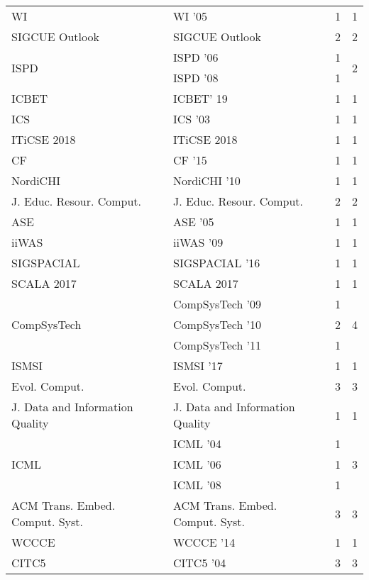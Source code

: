 \begin{table*}[t]
\begin{tabular}{llrr}
\multirow{1}{*}{WI } & WI '05 & 1 & \multirow{1}{*}{1}\\
\multirow{1}{*}{SIGCUE Outlook} & SIGCUE Outlook & 2 & \multirow{1}{*}{2}\\
\multirow{2}{*}{ISPD } & ISPD '06 & 1 & \multirow{2}{*}{2}\\
& ISPD '08 & 1 &\\
\multirow{1}{*}{ICBET} & ICBET' 19 & 1 & \multirow{1}{*}{1}\\
\multirow{1}{*}{ICS } & ICS '03 & 1 & \multirow{1}{*}{1}\\
\multirow{1}{*}{ITiCSE 2018} & ITiCSE 2018 & 1 & \multirow{1}{*}{1}\\
\multirow{1}{*}{CF } & CF '15 & 1 & \multirow{1}{*}{1}\\
\multirow{1}{*}{NordiCHI } & NordiCHI '10 & 1 & \multirow{1}{*}{1}\\
\multirow{1}{*}{J. Educ. Resour. Comput.} & J. Educ. Resour. Comput. & 2 & \multirow{1}{*}{2}\\
\multirow{1}{*}{ASE } & ASE '05 & 1 & \multirow{1}{*}{1}\\
\multirow{1}{*}{iiWAS } & iiWAS '09 & 1 & \multirow{1}{*}{1}\\
\multirow{1}{*}{SIGSPACIAL } & SIGSPACIAL '16 & 1 & \multirow{1}{*}{1}\\
\multirow{1}{*}{SCALA 2017} & SCALA 2017 & 1 & \multirow{1}{*}{1}\\
\multirow{3}{*}{CompSysTech } & CompSysTech '09 & 1 & \multirow{3}{*}{4}\\
& CompSysTech '10 & 2 &\\
& CompSysTech '11 & 1 &\\
\multirow{1}{*}{ISMSI } & ISMSI '17 & 1 & \multirow{1}{*}{1}\\
\multirow{1}{*}{Evol. Comput.} & Evol. Comput. & 3 & \multirow{1}{*}{3}\\
\multirow{1}{*}{J. Data and Information Quality} & J. Data and Information Quality & 1 & \multirow{1}{*}{1}\\
\multirow{3}{*}{ICML } & ICML '04 & 1 & \multirow{3}{*}{3}\\
& ICML '06 & 1 &\\
& ICML '08 & 1 &\\
\multirow{1}{*}{ACM Trans. Embed. Comput. Syst.} & ACM Trans. Embed. Comput. Syst. & 3 & \multirow{1}{*}{3}\\
\multirow{1}{*}{WCCCE } & WCCCE '14 & 1 & \multirow{1}{*}{1}\\
\multirow{1}{*}{CITC5 } & CITC5 '04 & 3 & \multirow{1}{*}{3}\\

\end{tabular}
\end{table*}
